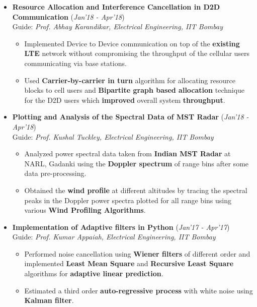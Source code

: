 \documentclass[10pt]{article}
\begin{document}
\begin{itemize}[leftmargin=0.4cm]
\item \textbf{Resource Allocation and Interference Cancellation in D2D Communication}
\hfill{(\textit{Jan'18 - Apr'18})}\\
Guide: \textit{Prof. Abhay Karandikar, Electrical Engineering, IIT Bombay}\\
\vspace{-0.7cm}
	\begin{itemize}
	\item Implemented Device to Device communication on top of the \textbf{existing LTE} network without compromising the throughput of the cellular users communicating via base stations.\vspace{-0.1cm}
	\item Used \textbf{Carrier-by-carrier in turn} algorithm for allocating resource blocks to cell users and \textbf{Bipartite graph based allocation} technique for the D2D users which \textbf{improved} overall system \textbf{throughput}.
    \end{itemize}

\newpage
	
\item \textbf{Plotting and Analysis of the Spectral Data of MST Radar}
\hfill{(\textit{Jan'18 - Apr'18})}\\
Guide: \textit{Prof. Kushal Tuckley, Electrical Engineering, IIT Bombay}\\\vspace{-0.68cm}
	\begin{itemize}
	\item Analyzed power spectral data taken from \textbf{Indian MST Radar} at NARL, Gadanki using the \textbf{Doppler spectrum} of range bins after some data pre-processing.\vspace{-0.1cm}
	\item Obtained the \textbf{wind profile} at different altitudes by tracing the spectral peaks in the Doppler power spectra plotted for all range bins using various \textbf{Wind Profiling Algorithms}.
	\end{itemize}
	
	\vspace{-0.2cm}
	
\item \textbf{Implementation of Adaptive filters in Python}
\hfill{(\textit{Jan'17 - Apr'17})}\\
Guide: \textit{Prof. Kumar Appaiah, Electrical Engineering, IIT Bombay}\\\vspace{-0.68cm}
    \begin{itemize}
    \item Performed noise cancellation using \textbf{Wiener filters} of different order and implemented \textbf{Least Mean Square} and \textbf{Recursive Least Square} algorithms for \textbf{adaptive linear prediction}.\vspace{-0.1cm}
    \item Estimated a third order \textbf{auto-regressive process} with white noise using \textbf{Kalman filter}. 
    \end{itemize}
    \vspace{-0.2cm}
    

\end{itemize}
\end{document}
